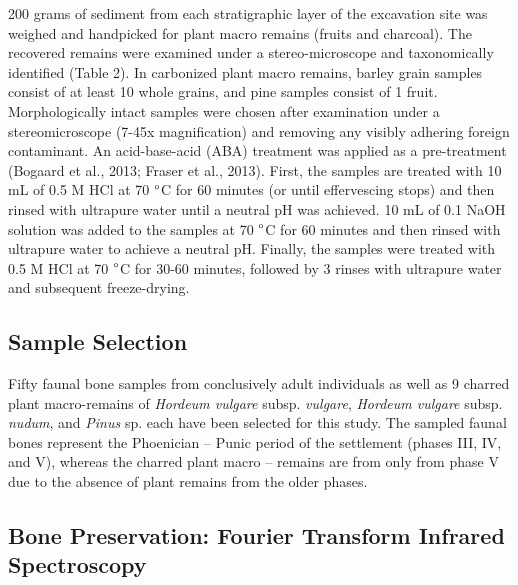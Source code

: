 \documentclass[3p]{elsarticle} %
\begin{document}
200 grams of sediment from each stratigraphic layer of the excavation site was weighed and handpicked for plant macro remains (fruits and charcoal). The recovered remains were examined under a stereo-microscope and taxonomically identified (Table 2).
In carbonized plant macro remains, barley grain samples consist of at least 10 whole grains, and pine samples consist of 1 fruit. Morphologically intact samples were chosen after examination under a stereomicroscope (7-45x magnification) and removing any visibly adhering foreign contaminant. An acid-base-acid (ABA) treatment was applied as a pre-treatment (Bogaard et al., 2013; Fraser et al., 2013). First, the samples are treated with 10 mL of 0.5 M HCl at 70 \(\text{\textdegree}\)C for 60 minutes (or until effervescing stops) and then rinsed with ultrapure water until a neutral pH was achieved. 10 mL of 0.1 NaOH solution was added to the samples at 70 \(\text{\textdegree}\)C for 60 minutes and then rinsed with ultrapure water to achieve a neutral pH. Finally, the samples were treated with 0.5 M HCl at 70 \(\text{\textdegree}\)C for 30-60 minutes, followed by 3 rinses with ultrapure water and subsequent freeze-drying.

\hypertarget{sample-selection}{%
\subsection{Sample Selection}\label{sample-selection}}

Fifty faunal bone samples from conclusively adult individuals as well as 9 charred plant macro-remains of \emph{Hordeum vulgare} subsp. \emph{vulgare}, \emph{Hordeum vulgare} subsp. \emph{nudum}, and \emph{Pinus} sp. each have been selected for this study. The sampled faunal bones represent the Phoenician -- Punic period of the settlement (phases III, IV, and V), whereas the charred plant macro -- remains are from only from phase V due to the absence of plant remains from the older phases.

\hypertarget{bone-preservation-fourier-transform-infrared-spectroscopy}{%
\subsection{Bone Preservation: Fourier Transform Infrared Spectroscopy}\label{bone-preservation-fourier-transform-infrared-spectroscopy}}
\end{document}
